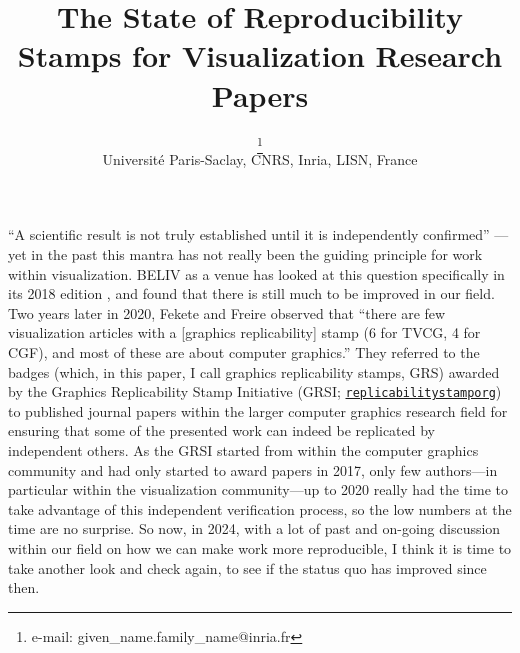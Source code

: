 \documentclass[conference]{vgtc}                     %
\title{The State of Reproducibility Stamps for Visualization Research Papers}
\author{%
  \authororcid{Tobias Isenberg}{0000-0001-7953-8644}\thanks{e-mail: given\_name.family\_name@inria.fr}\\ %
        \scriptsize Université Paris-Saclay, CNRS, Inria, LISN, France%
}
\begin{document}


\maketitle

``A scientific result is not truly established until it is independently confirmed'' \cite{Boisvert:2016:IR}---yet in the past this mantra has not really been the guiding principle for work within visualization. BELIV as a venue has looked at this question specifically in its 2018 edition \cite{Haroz:2018:OPV,Kosara:2018:SRC,Sukumar:2018:TDU,Valdez:2018:RRR}, and found that there is still much to be improved in our field. Two years later in 2020, Fekete and Freire \cite{Fekete:2020:ERV} observed that ``there are few visualization articles with a [graphics replicability] stamp (6 for TVCG, 4 for CGF), and most of these are about computer graphics.'' They referred to the badges (which, in this paper, I call graphics replicability\footnotemark{} stamps, GRS) awarded by the Graphics Replicability Stamp Initiative (GRSI; \href{https://www.replicabilitystamp.org/}{\texttt{replicabilitystamporg}}) to published journal\footnotemark{} papers within the larger computer graphics research field for ensuring that some of the presented work can indeed be replicated by independent others. As the GRSI started from within the computer graphics community and had only started to award papers in 2017, only few authors---in particular within the visualization community---up to 2020 really had the time to take advantage of this independent verification process, so the low numbers at the time are no surprise. So now, in 2024, with a lot of past and on-going discussion within our field on how we can make work more reproducible, I think it is time to take another look and check again, to see if the status quo has improved since then.
\end{document}
